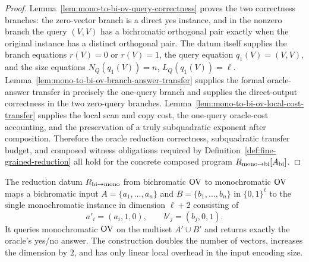 \begin{proof}
  Lemma~\ref{lem:mono-to-bi-ov-query-correctness} proves the two correctness
  branches: the zero-vector branch is a direct yes instance, and in the
  nonzero branch the query $(V,V)$ has a bichromatic orthogonal pair exactly
  when the original instance has a distinct orthogonal pair.  The datum itself
  supplies the branch equations $r(V)=0$ or $r(V)=1$, the query equation
  $q_1(V)=(V,V)$, and the size equations
  $N_Q(q_1(V))=n$, $L_Q(q_1(V))=\ell$.
  Lemma~\ref{lem:mono-to-bi-ov-branch-answer-transfer} supplies the formal
  oracle-answer transfer in precisely the one-query branch and supplies the
  direct-output correctness in the two zero-query branches.
  Lemma~\ref{lem:mono-to-bi-ov-local-cost-transfer} supplies the local scan and
  copy cost, the one-query oracle-cost accounting, and the preservation of a
  truly subquadratic exponent after composition.  Therefore the oracle
  reduction correctness, subquadratic transfer budget, and composed witness
  obligations required by Definition~\ref{def:fine-grained-reduction} all hold
  for the concrete composed program $R_{\rm mono\to bi}[A_{\rm bi}]$.
\end{proof}

\begin{definition}
  \label{def:bi-to-mono-ov-reduction-datum}
  The reduction datum $R_{\rm bi\to mono}$ from bichromatic $\mathrm{OV}$ to
  monochromatic $\mathrm{OV}$ maps a bichromatic input
  $A=\{a_1,\ldots,a_n\}$ and $B=\{b_1,\ldots,b_n\}$ in $\{0,1\}^{\ell}$ to the
  single monochromatic instance in dimension $\ell+2$ consisting of
  \[
    a'_i=(a_i,1,0),\qquad b'_j=(b_j,0,1).
  \]
  It queries monochromatic $\mathrm{OV}$ on the multiset
  $A'\cup B'$ and returns exactly the oracle's yes/no answer.  The construction
  doubles the number of vectors, increases the dimension by $2$, and has only
  linear local overhead in the input encoding size.
\end{definition}

